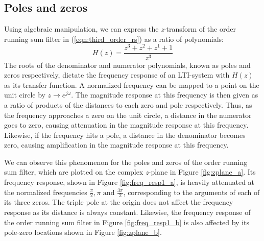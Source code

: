 \documentclass[journal]{IEEEtran}
\begin{document}
\subsection{Poles and zeros}
Using algebraic manipulation, we can express the \textit{z}-transform of the  order running sum filter in (\ref{eqn:third_order_rs}) as a ratio of polynomials: 
\begin{equation}
\label{eqn:third_order_rs_tf}
    H(z) = \frac{z^3+z^2+z^1+1}{z^3}
\end{equation}
The roots of the denominator and numerator polynomials, known as poles and zeros respectively, dictate the frequency response of an LTI-system with $H(z)$ as its transfer function. A normalized frequency can be mapped to a point on the unit circle by $z \rightarrow e^{j \omega}$. The magnitude response at this frequency is then given as a ratio of products of the distances to each zero and pole respectively. Thus, as the frequency approaches a zero on the unit circle, a distance in the numerator goes to zero, causing attenuation in the magnitude response at this frequency. Likewise, if the frequency hits a pole, a distance in the denominator becomes zero, causing amplification in the magnitude response at this frequency. 

We can observe this phenomenon for the poles and zeros of the  order running sum filter, which are plotted on the complex \textit{z}-plane in Figure \ref{fig:zplane_a}. Its frequency response, shown in Figure \ref{fig:freq_resp1_a}, is heavily attenuated at the normalized frequencies $\frac{\pi}{2}, \pi \text{ and } \frac{3 \pi}{2}$, corresponding to the arguments of each of its three zeros. The triple pole at the origin does not affect the frequency response as its distance is always constant. Likewise, the frequency response of the  order running sum filter in Figure \ref{fig:freq_resp1_b} is also affected by its pole-zero locations shown in Figure \ref{fig:zplane_b}. 

\end{document}
